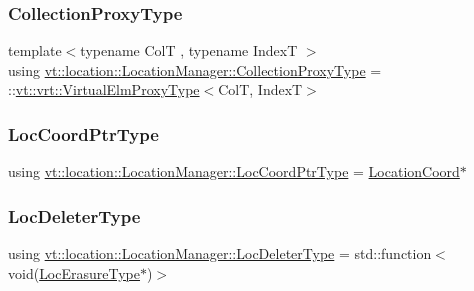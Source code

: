 \mbox{\label{structvt_1_1location_1_1_location_manager_add8d70c599ff0f03bc7a0d7eaed249d0}} 
\subsubsection{\texorpdfstring{Collection\+Proxy\+Type}{CollectionProxyType}}
{\footnotesize\ttfamily template$<$typename ColT , typename IndexT $>$ \\
using \hyperlink{structvt_1_1location_1_1_location_manager_add8d70c599ff0f03bc7a0d7eaed249d0}{vt\+::location\+::\+Location\+Manager\+::\+Collection\+Proxy\+Type} =  \+::\hyperlink{namespacevt_1_1vrt_a620a5c8c59d13e513f690c74b4af516f}{vt\+::vrt\+::\+Virtual\+Elm\+Proxy\+Type}$<$ColT, IndexT$>$}

\mbox{\label{structvt_1_1location_1_1_location_manager_a98ed824c058080e538546fc731cb8f4c}} 
\subsubsection{\texorpdfstring{Loc\+Coord\+Ptr\+Type}{LocCoordPtrType}}
{\footnotesize\ttfamily using \hyperlink{structvt_1_1location_1_1_location_manager_a98ed824c058080e538546fc731cb8f4c}{vt\+::location\+::\+Location\+Manager\+::\+Loc\+Coord\+Ptr\+Type} =  \hyperlink{structvt_1_1location_1_1_location_coord}{Location\+Coord}$\ast$}

\mbox{\label{structvt_1_1location_1_1_location_manager_ab0ce8907fcf9b36cf884af08c744ddb1}} 
\subsubsection{\texorpdfstring{Loc\+Deleter\+Type}{LocDeleterType}}
{\footnotesize\ttfamily using \hyperlink{structvt_1_1location_1_1_location_manager_ab0ce8907fcf9b36cf884af08c744ddb1}{vt\+::location\+::\+Location\+Manager\+::\+Loc\+Deleter\+Type} =  std\+::function$<$void(\hyperlink{structvt_1_1location_1_1_location_manager_a0c153c55a8938e99fad5386699653220}{Loc\+Erasure\+Type}$\ast$)$>$}

